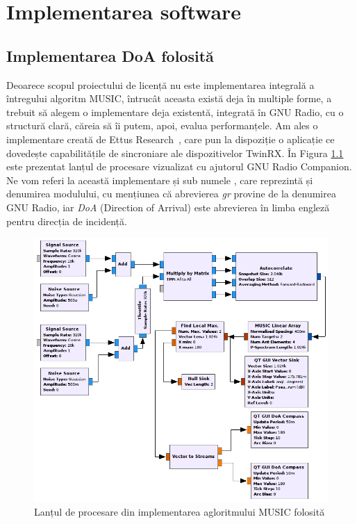 \chapter{Implementarea software}
\label{chapter:impl}

\section{Implementarea DoA folosită}
\label{sec:gr-doa}

Deoarece scopul proiectului de licență nu este implementarea integrală a
întregului algoritm MUSIC, întrucât aceasta există deja în multiple forme, a
trebuit să alegem o implementare deja existentă, integrată în GNU Radio, cu o
structură clară, căreia să îi putem, apoi, evalua performanțele. Am ales o
implementare creată de Ettus Research~\cite{ettus-doa}, care pun la dispoziție o
aplicație ce dovedește capabilitățile de sincroniare ale dispozitivelor TwinRX.
În Figura \ref{fig:grc-fg} este prezentat lanțul de procesare vizualizat cu
ajutorul GNU Radio Companion. Ne vom referi la această implementare și sub
numele , care reprezintă și denumirea modulului, cu mențiunea că
abrevierea \textit{gr} provine de la denumirea GNU Radio, iar \textit{DoA}
(Direction of Arrival) este abrevierea în limba engleză pentru direcția de
incidență. 

\begin{figure}[h]
    \centering
    \includegraphics[width=\textwidth]{src/img/graph-doa}
    \caption{Lanțul de procesare din implementarea agloritmului MUSIC folosită}
    \label{fig:grc-fg}
\end{figure}

